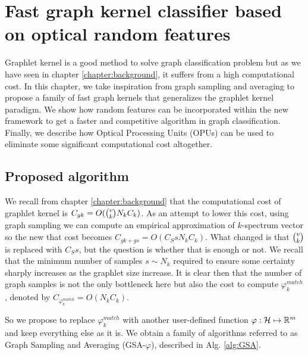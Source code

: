 \chapter{Fast graph kernel classifier based on optical random features }
\label{chapter:fast_algorithm}
\newtheorem{lemma}{Lemma} 
Graphlet kernel  is a good method to solve graph classification problem but as we have seen in chapter \ref{chapter:background}, it suffers from a high computational cost. In this chapter, we take inspiration from graph sampling and averaging to propose a family of fast graph kernels that generalizes the graphlet kernel paradigm. We show how random features can be incorporated within the new framework to get a faster and competitive algorithm in graph classification. Finally, we describe how Optical Processing Units (OPUs) can be used to eliminate some significant computational cost altogether.

\section{Proposed algorithm}
We recall from chapter \ref{chapter:background} that the computational cost of graphlet kernel is $C_{gk}= O(\tbinom{v}{k} N_k C_k)$. As an attempt to lower this cost, using graph sampling we can compute an empirical approximation of $k$-spectrum vector so the new that cost becomes $C_{gk + gs}= O(C_S s N_k C_k)$. What changed is that $\tbinom{v}{k}$ is replaced with $C_S s$, but the question is whether that is enough or not. We recall that the minimum number of samples $s \sim N_k$ required to ensure some certainty sharply increases as the graphlet size increase. It is clear then that the number of graph samples is not the only bottleneck here but also the cost to compute $\varphi_k^{match}$, denoted by $C_{\varphi_k^{match}}=O(N_k C_k)$.

So we propose to replace $\varphi^{match}_k$ with another user-defined function $\varphi:\mathcal{H} \mapsto\mathbb{R}^m$ and keep everything else as it is. We obtain a family of algorithms referred to as Graph Sampling and Averaging (GSA-$\varphi$), described in Alg. \ref{alg:GSA}.

